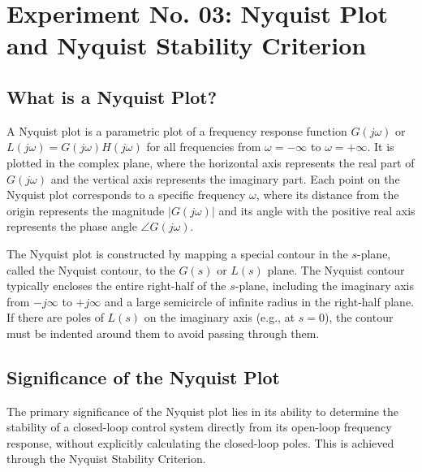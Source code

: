 \documentclass[a4paper,12pt]{article}
\begin{document}
	\newpage
	
	\section*{Experiment No. 03: Nyquist Plot and Nyquist Stability Criterion}
	
	\subsection*{What is a Nyquist Plot?}
	
	A Nyquist plot is a parametric plot of a frequency response function $G(j\omega)$ or $L(j\omega) = G(j\omega)H(j\omega)$ for all frequencies from $\omega = -\infty$ to $\omega = +\infty$. It is plotted in the complex plane, where the horizontal axis represents the real part of $G(j\omega)$ and the vertical axis represents the imaginary part. Each point on the Nyquist plot corresponds to a specific frequency $\omega$, where its distance from the origin represents the magnitude $|G(j\omega)|$ and its angle with the positive real axis represents the phase angle $\angle G(j\omega)$.
	
	The Nyquist plot is constructed by mapping a special contour in the $s$-plane, called the Nyquist contour, to the $G(s)$ or $L(s)$ plane. The Nyquist contour typically encloses the entire right-half of the $s$-plane, including the imaginary axis from $-j\infty$ to $+j\infty$ and a large semicircle of infinite radius in the right-half plane. If there are poles of $L(s)$ on the imaginary axis (e.g., at $s=0$), the contour must be indented around them to avoid passing through them.
	
	\subsection*{Significance of the Nyquist Plot}
	
	The primary significance of the Nyquist plot lies in its ability to determine the stability of a closed-loop control system directly from its open-loop frequency response, without explicitly calculating the closed-loop poles. This is achieved through the Nyquist Stability Criterion.
	
\end{document}
